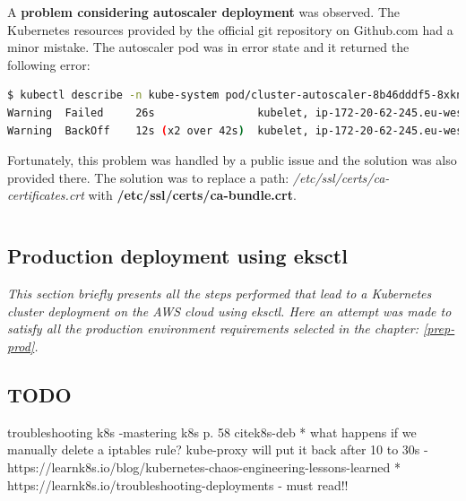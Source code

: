 A \textbf{problem considering autoscaler deployment} was observed. The Kubernetes resources provided by the official git repository on Github.com had a minor mistake. The autoscaler pod was in error state and it returned the following error:
\begin{lstlisting}[basicstyle=\tiny,caption={TODO},captionpos=b,language=Bash,xleftmargin=1cm]
$ kubectl describe -n kube-system pod/cluster-autoscaler-8b46dddf5-8xkns
Warning  Failed     26s                kubelet, ip-172-20-62-245.eu-west-1.compute.internal  Error: failed to start container "cluster-autoscaler": Error response from daemon: OCI runtime create failed: container_linux.go:346: starting container process caused "process_linux.go:449: container init caused \"rootfs_linux.go:58: mounting \\\"/etc/ssl/certs/ca-bundle.crt\\\" to rootfs \\\"/var/lib/docker/overlay2/0f99e6ea6c9a9f8dedf87b977b72ecff7b56e0e6e439fcd8f9275bda3dbcabe6/merged\\\" at \\\"/var/lib/docker/overlay2/0f99e6ea6c9a9f8dedf87b977b72ecff7b56e0e6e439fcd8f9275bda3dbcabe6/merged/etc/ssl/certs/ca-certificates.crt\\\" caused \\\"not a directory\\\"\"": unknown: Are you trying to mount a directory onto a file (or vice-versa)? Check if the specified host path exists and is the expected type
Warning  BackOff    12s (x2 over 42s)  kubelet, ip-172-20-62-245.eu-west-1.compute.internal  Back-off restarting failed container
\end{lstlisting}

Fortunately, this problem was handled by a public issue and the solution was also provided there\cite{as-github-issue}. The solution was to replace a path: \textit{/etc/ssl/certs/ca-certificates.crt} with \textbf{/etc/ssl/certs/ca-bundle.crt}.


\begin{lstlisting}[basicstyle=\tiny,caption={TODO},captionpos=b,language=Bash,xleftmargin=1cm]
\end{lstlisting}

\subsection{Production deployment using eksctl}
\textit{This section briefly presents all the steps performed that lead to a Kubernetes cluster deployment on the AWS cloud using eksctl. Here an attempt was made to satisfy all the production environment requirements selected in the chapter: \ref{prep-prod}.}
\\

\subsection{TODO}

troubleshooting k8s -mastering k8s p. 58 cite{k8s-deb}
* what happens if we manually delete a iptables rule? kube-proxy will put it back after 10 to 30s - https://learnk8s.io/blog/kubernetes-chaos-engineering-lessons-learned
* https://learnk8s.io/troubleshooting-deployments - must read!!
